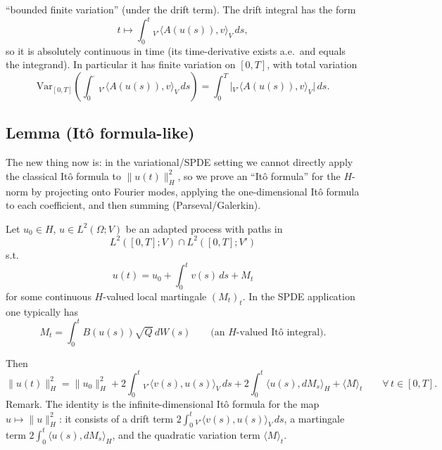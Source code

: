\documentclass[11pt]{article}
\theoremstyle{definition}
\theoremstyle{remark}
\begin{document}
\smallskip
\noindent
``bounded finite variation'' (under the drift term).
\medskip
\noindent
The drift integral has the form
\[
t\longmapsto \int_{0}^{t}{}_{V'}\langle A(u(s)),v\rangle_{V}\,ds,
\]
so it is absolutely continuous in time (its time-derivative exists a.e.\ and equals the integrand). In particular it has finite variation on \([0,T]\), with total variation
\[
\mathrm{Var}_{[0,T]}\!\left(\int_{0}^{\cdot}{}_{V'}\langle A(u(s)),v\rangle_{V}\,ds\right)
=\int_{0}^{T}\big|{}_{V'}\langle A(u(s)),v\rangle_{V}\big|\,ds.
\]

\subsection*{Lemma (It\^o formula-like)}
\noindent
The new thing now is:
in the variational/SPDE setting we cannot directly apply the classical It\^o formula to \(\|u(t)\|_{H}^{2}\), so we prove an ``It\^o formula'' for the \(H\)-norm by projecting onto Fourier modes, applying the one-dimensional It\^o formula to each coefficient, and then summing (Parseval/Galerkin).

Let \(u_{0}\in H\), \(u\in L^{2}(\Omega;V)\) be an adapted process with paths in
\[
L^{2}([0,T];V)\cap L^{2}([0,T];V')
\]
s.t.
\[
u(t)=u_{0}+\int_{0}^{t}v(s)\,ds+M_{t}
\]
for some continuous \(H\)-valued local martingale \((M_{t})_{t}\).
In the SPDE application one typically has
\[
M_t=\int_0^t B(u(s))\sqrt{Q}\,dW(s)\qquad\text{(an \(H\)-valued It\^o integral)}.
\]

Then
\[
\|u(t)\|_{H}^{2}
=\|u_{0}\|_{H}^{2}
+2\int_{0}^{t}{}_{V'}\langle v(s),u(s)\rangle_{V}\,ds
+2\int_{0}^{t}\langle u(s),dM_{s}\rangle_{H}
+\langle M\rangle_{t}
\qquad \forall\,t\in[0,T].
\]
\medskip
\noindent
Remark.
The identity is the infinite-dimensional It\^o formula for the map \(u\mapsto \|u\|_{H}^{2}\): it consists of a drift term \(2\int_{0}^{t}{}_{V'}\langle v(s),u(s)\rangle_{V}\,ds\), a martingale term \(2\int_{0}^{t}\langle u(s),dM_{s}\rangle_{H}\), and the quadratic variation term \(\langle M\rangle_{t}\).
\end{document}
